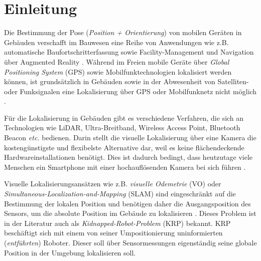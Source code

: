 
\section{Einleitung}
%
%
%
%
%
%
%
%
%
%
%
%
%
%




Die Bestimmung der Pose (\textit{Position + Orientierung}) von mobilen Geräten in Gebäuden verschafft im Bauwesen eine Reihe von Anwendungen wie z.B. automatische Baufortschritterfassung sowie Facility-Management und Navigation über Augmented Reality \cite{kroppModelbasedPoseEstimation2016, kochNaturalMarkersAugmented2014}.
Während im Freien mobile Geräte über \textit{Global Positioning System} (GPS) sowie Mobilfunktechnologien lokalisiert werden können, ist grundsätzlich in Gebäuden sowie in der Abwesenheit von Satelliten- oder Funksignalen eine Lokalisierung über GPS oder Mobilfunknetz nicht möglich \cite{yassinRecentAdvancesIndoor2016}. 

Für die Lokalisierung in Gebäuden gibt es verschiedene Verfahren, die sich an Technologien wie LiDAR, Ultra-Breitband, Wireless Access Point, Bluetooth Beacon \textit{etc.} bedienen. Darin stellt die visuelle Lokalisierung über eine Kamera die kostengünstigste und flexibelste Alternative dar, weil es keine flächendeckende Hardwareinstallationen benötigt. Dies ist dadurch bedingt, dass heutzutage viele Menschen ein Smartphone mit einer hochauflösenden Kamera bei sich führen \cite{wuImagebasedCameraLocalization2018}.

Visuelle Lokalisierungsansätzen wie z.B. 
\textit{visuelle Odemetrie} (VO) oder \textit{Simultaneous-Localization-and-Mapping} (SLAM) sind eingeschränkt auf die Bestimmung der lokalen Position und benötigen daher die Ausgangsposition des Sensors, um die absolute Position im Gebäude zu lokalisieren \cite{stephenseGlobalLocalizationUsing2002}. Dieses Problem ist in der Literatur auch als \textit{Kidnapped-Robot-Problem} (KRP) bekannt. KRP beschäftigt sich mit einem von seiner Umpositionierung uninformierten (\textit{entführten}) Roboter. Dieser soll über Sensormessungen eigenständig seine globale Position in der Umgebung lokalisieren soll.


